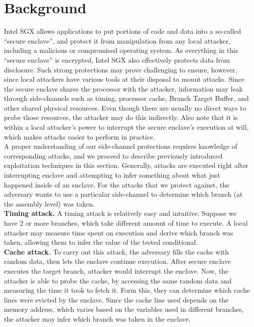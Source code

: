 \documentclass[sigplan, review]{acmart}
\begin{document}
\section{Background}
Intel SGX allows applications to put portions of code and data into a so-called “secure enclave”, and protect it from manipulation from any local attacker, including a malicious or compromised operating system. As everything in this “secure enclave” is encrypted, Intel SGX also effectively protects data from disclosure. Such strong protections may prove challenging to ensure, however, since local attackers have various tools at their disposal to mount attacks. Since the secure enclave shares the processor with the attacker, information may leak through side-channels such as timing, processor cache, Branch Target Buffer, and other shared physical resources. Even though there are usually no direct ways to probe those resources, the attacker may do this indirectly. Also note that it is within a local attacker’s power to interrupt the secure enclave’s execution at will, which makes attacks easier to perform in practice.\\
A proper understanding of our side-channel protections requires knowledge of corresponding attacks, and we proceed to describe previously introduced exploitation techniques in this section. Generally, attacks are executed right after interrupting enclave and attempting to infer something about what just happened inside of an enclave. For the attacks that we protect against, the adversary wants to use a particular side-channel to determine which branch (at the assembly level) was taken.\\
\textbf{Timing attack.}\cite{kocher1996timing} A timing attack is relatively easy and intuitive. Suppose we have 2 or more branches, which take different amount of time to execute. A local attacker may measure time spent on execution and derive which branch was taken, allowing them to infer the value of the tested conditional.\\
\textbf{Cache attack.}\cite{osvik2006cache} To carry out this attack, the adversary fills the cache with random data, then lets the enclave continue execution. After secure enclave executes the target branch, attacker would interrupt the enclave. Now, the attacker is able to probe the cache, by accessing the same random data and measuring the time it took to fetch it. Form this, they can determine which cache lines were evicted by the enclave. Since the cache line used depends on the memory address, which varies based on the variables used in different branches, the attacker may infer which branch was taken in the enclave.\\
\end{document}
